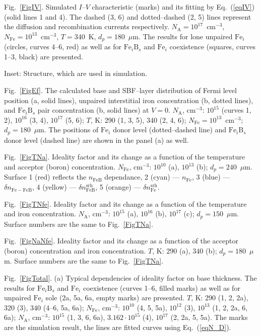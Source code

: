 ﻿\documentclass[12pt]{article}
\begin{document}
 Fig.~\ref{FigIV}.
Simulated $I$--$V$ characteristic (marks) and its fitting by Eq.~(\ref{eqIV}) (solid lines 1 and 4).
The dashed (3, 6) and dotted–dashed (2, 5) lines represent the diffusion and recombination currents respectively.
$N_\mathrm{A}=10^{17}$~cm$^{-3}$, $N_\mathrm{Fe}=10^{13}$~cm$^{-3}$, $T=340$~K, $d_p=180$~$\mu$m.
The results for lone unpaired $\mathrm{Fe}_i$ (circles, curves 4--6, red) as well as for $\mathrm{Fe}_i\mathrm{B}_s$ and $\mathrm{Fe}_i$ coexistence
(squares, curves 1--3, black) are presented.

Inset: Structure, which are used in simulation.



 Fig.~\ref{FigEf}.
The calculated base and SBF--layer distribution of Fermi level position (a, solid lines), unpaired interstitial iron concentration (b, dotted lines),
and $\mathrm{Fe}_i\mathrm{B}_s$ pair concentration (b, solid lines) at $V=0$.
$N_\mathrm{A}$, cm$^{-3}$: $10^{15}$ (curves 1, 2), $10^{16}$ (3, 4), $10^{17}$ (5, 6);
$T$, K: 290 (1, 3, 5), 340 (2, 4, 6);
$N_\mathrm{Fe}=10^{13}$~cm$^{-3}$;
$d_p=180$~$\mu$m.
The positions of $\mathrm{Fe}_i$ donor level (dotted--dashed line) and $\mathrm{Fe}_i\mathrm{B}_s$
 donor level (dashed line) are shown in the panel (a) as well.

 Fig.~\ref{FigTNa}.
Ideality factor and its change as a function of the temperature and acceptor (boron) concentration.
$N_\mathrm{Fe}$, cm$^{-3}$: $10^{10}$ (a), $10^{13}$ (b);
$d_p=240$~$\mu$m.
Surface 1 (red) reflects the  $n_\mathrm{FeB}$ dependance,
2 (cyan) ---  $n_\mathrm{Fe}$,
3 (blue) --- $\delta n_\mathrm{Fe-FeB}$,
4 (yellow) --- $\delta n_\mathrm{FeB}^\mathrm{srh}$,
5 (orange) --- $\delta n_\mathrm{Fe}^\mathrm{srh}$.


 Fig.~\ref{FigTNfe}.
Ideality factor and its change as a function of the temperature and iron concentration.
$N_\mathrm{A}$, cm$^{-3}$: $10^{15}$ (a), $10^{16}$ (b), $10^{17}$ (c);
$d_p=150$~$\mu$m.
Surface numbers are the same to Fig.~\ref{FigTNa}.

 Fig.~\ref{FigNaNfe}.
Ideality factor and its change as a function of the acceptor (boron) concentration and iron concentration.
$T$, K: $290$ (a), $340$ (b);
$d_p=180$~$\mu$m.
Surface numbers are the same to Fig.~\ref{FigTNa}.


 Fig.~\ref{FigTotal}.
(a) Typical dependencies of ideality factor on base thickness.
The results for $\mathrm{Fe}_i\mathrm{B}_s$ and $\mathrm{Fe}_i$ coexistence (curves 1--6, filled marks)
as well as for unpaired $\mathrm{Fe}_i$ sole (2a, 5a, 6a, empty marks) are presented.
$T$, K: 290 (1, 2, 2a), 320 (3), 340 (4--6, 5a, 6a);
$N_\mathrm{Fe}$, cm$^{-3}$: $10^{10}$ (4, 5, 5a), $10^{12}$ (3), $10^{13}$ (1, 2, 2a, 6, 6a);
$N_\mathrm{A}$, cm$^{-3}$: $10^{15}$ (1, 3, 6, 6a), $3.162\cdot10^{15}$ (4),  $10^{17}$ (2, 2a, 5, 5a).
The marks are the simulation result,
the lines are fitted curves using Eq.~(\ref{eqN_D}).
\end{document}
